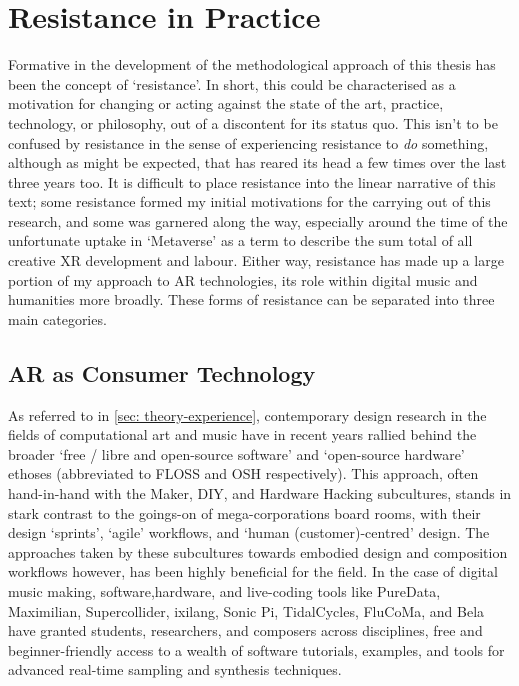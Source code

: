 \section{Resistance in Practice}\label{sec: method-resistance}
Formative in the development of the methodological approach of this thesis has been the concept of `resistance'. In short, this could be characterised as a motivation for changing or acting against the state of the art, practice, technology, or philosophy, out of a discontent for its status quo. This isn't to be confused by resistance in the sense of experiencing resistance to \textit{do} something, although as might be expected, that has reared its head a few times over the last three years too. It is difficult to place resistance into the linear narrative of this text; some resistance formed my initial motivations for the carrying out of this research, and some was garnered along the way, especially around the time of the unfortunate uptake in `Metaverse' as a term to describe the sum total of all creative XR development and labour. Either way, resistance has made up a large portion of my approach to AR technologies, its role within digital music and humanities more broadly. These forms of resistance can be separated into three main categories.

\subsection{AR as Consumer Technology}\label{sec: method-resistance-maker}
As referred to in \autoref{sec: theory-experience}, contemporary design research in the fields of computational art and music have in recent years rallied behind the broader `free / libre and open-source software' and `open-source hardware' ethoses (abbreviated to FLOSS and OSH respectively). This approach, often hand-in-hand with the Maker, DIY, and Hardware Hacking subcultures, stands in stark contrast to the goings-on of mega-corporations board rooms, with their design `sprints', `agile' workflows, and `human (customer)-centred' design. The approaches taken by these subcultures towards embodied design and composition workflows however, has been highly beneficial for the field. In the case of digital music making, software,hardware, and live-coding tools like PureData, Maximilian, Supercollider, ixilang, Sonic Pi, TidalCycles, FluCoMa, and Bela have granted students, researchers, and composers across disciplines, free and beginner-friendly access to a wealth of software tutorials, examples, and tools for advanced real-time sampling and synthesis techniques.

